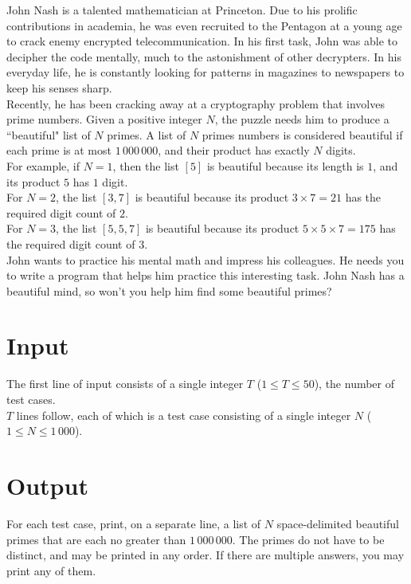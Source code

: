 
\noindent John Nash is a talented mathematician at Princeton. Due to his prolific contributions in academia, he was even recruited to the Pentagon at a young age to crack enemy encrypted telecommunication. In his first task, John was able to decipher the code mentally, much to the astonishment of other decrypters. In his everyday life, he is constantly looking for patterns in magazines to newspapers to keep his senses sharp.\\

Recently, he has been cracking away at a cryptography problem that involves prime numbers. Given a positive integer $N$, the puzzle needs him to produce a ``beautiful" list of $N$ primes. A list of $N$ primes numbers is considered beautiful if each prime is at most $1\,000\,000$, and their product has exactly $N$ digits.\\

For example, if $N = 1$, then the list $[5]$ is beautiful because its length is $1$, and its product $5$ has $1$ digit.\\

For $N = 2$, the list $[3, 7]$ is beautiful because its product $3 \times 7 = 21$ has the required digit count of $2$.\\

For $N = 3$, the list $[5, 5, 7]$ is beautiful because its product $5 \times 5 \times 7 = 175$ has the required digit count of $3$.\\

John wants to practice his mental math and impress his colleagues. He needs you to write a program that helps him practice this interesting task. John Nash has a beautiful mind, so won't you help him find some beautiful primes?

\section*{Input}
The first line of input consists of a single integer $T$ ($1 \leq T \leq 50$), the number of test cases.\\
$T$ lines follow, each of which is a test case consisting of a single integer $N$ ($1 \leq N \leq 1\,000$).

\section*{Output}
For each test case, print, on a separate line, a list of $N$ space-delimited beautiful primes that are each no greater than $1\,000\,000$. The primes do not have to be distinct, and may be printed in any order. If there are multiple answers, you may print any of them.\\
